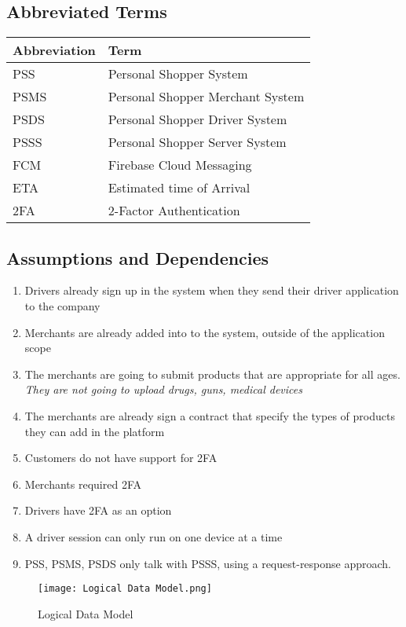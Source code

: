 \subsection{Abbreviated Terms}
\begin{center}
    \begin{tabular}{p{}p{}}
    \hline
    \textbf{Abbreviation} & \textbf{Term} \\ 
     \hline
     PSS & Personal Shopper System \\  
     \hline
     PSMS &  Personal Shopper Merchant System \\  
     \hline
     PSDS &  Personal Shopper Driver System \\  
     \hline
     PSSS &  Personal Shopper Server System \\  
     \hline
     FCM &  Firebase Cloud Messaging \\  
     \hline
     ETA & Estimated time of Arrival \\  
     \hline
     2FA & 2-Factor Authentication  \\  
     \hline
    \end{tabular}
\end{center}

\pagebreak

\subsection{Assumptions and Dependencies}
\begin{enumerate}[label=AS-\arabic*]
    \item Drivers already sign up in the system when they send their 
    driver application to the company
    \item Merchants are already added into to the system, outside of the 
    application scope
    \item The merchants are going to submit products that are appropriate for 
    all ages. \textit{They are not going to upload drugs, guns, 
    medical devices}
    \item The merchants are already sign a contract that specify the types of 
    products they can add in the platform
    \item Customers do not have support for 2FA
    \item Merchants required 2FA
    \item Drivers have 2FA as an option
    \item A driver session can only run on one device at a time
    \item PSS, PSMS, PSDS only talk with PSSS, using a 
    request-response approach.
\end{enumerate}
\begin{figure}[!htb]
    \centering
    \texttt{[image: Logical Data Model.png]}
    \caption{Logical Data Model}
\end{figure}

